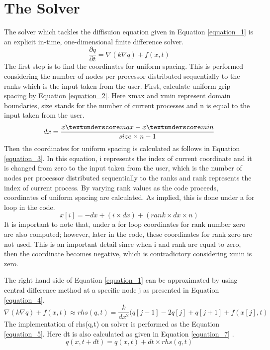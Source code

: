 \documentclass{article}
\begin{document}
\section{The Solver}
The solver which tackles the diffisuion equation given in Equation \ref{equation_1} is an explicit in-time, one-dimensional finite difference solver. 
\begin{equation} %
    \frac{\partial q}{\partial t} = \nabla (k\nabla q) + f(x,t)  
    \label{equation_1}
\end{equation}
The first step is to find the coordinates for uniform spacing. This is performed considering the number of nodes per processor distributed sequentially to the ranks which is the input taken from the user. First, calculate uniform grip spacing by Equation \ref{equation_2}. Here x\textunderscore max and x\textunderscore min represent domain boundaries, size stands for the number of current processes and n is equal to the input taken from the user. 
\begin{equation} %
    dx = \frac{x\textunderscore max - x\textunderscore min}{size \times n - 1} 
    \label{equation_2}
\end{equation}
Then the coordinates for uniform spacing is calculated as follows in Equation \ref{equation_3}. In this equation, i represents the index of current coordinate and it is changed from zero to the input taken from the user, which is the number of nodes per processor distributed sequentially to the ranks and rank represents the index of current process. By varying rank values as the code proceeds, coordinates of uniform spacing are calculated. As implied, this is done under a for loop in the code. 
\begin{equation} %
    x[i] = -dx + (i\times dx) + (rank\times dx\times n) 
    \label{equation_3}
\end{equation}
It is important to note that, under a for loop coordinates for rank number zero are also computed; however, later in the code, these coordinates for rank zero are not used. This is an important detail since when i and rank are equal to zero, then the coordinate becomes negative, which is contradictory considering x\textunderscore min is zero. 

The right hand side of Equation \ref{equation_1} can be approximated by using central difference method at a specific node j as presented in Equation \ref{equation_4}. 
\begin{equation} %
    \nabla (k\nabla q) + f(x,t) \approx rhs(q,t) = \frac{k}{dx^2} (q[j-1]-2q[j]+q[j+1] + f(x[j],t)
    \label{equation_4}
\end{equation}
The implementation of rhs(q,t) on solver is performed as the Equation \ref{equation_5}. Here dt is also calculated as given in Equation \ref{equation_7} . 
\begin{equation} %
    q(x,t+dt) = q(x,t) + dt\times rhs(q,t)
    \label{equation_5}
\end{equation}
\end{document}
